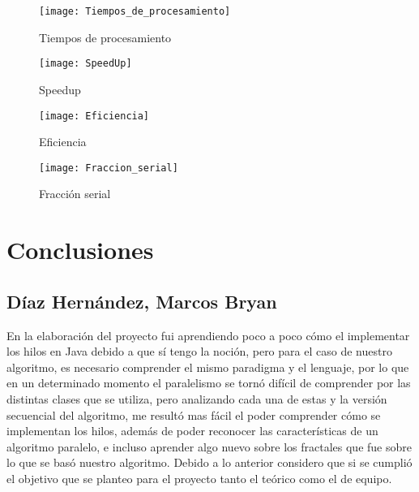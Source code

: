 \documentclass[12pt,a4paper]{article}
\begin{document}
		
			\begin{figure}[h]
				\centering
				\texttt{[image: Tiempos\_de\_procesamiento]}
				\caption{Tiempos de procesamiento}
			\end{figure}
	
			\begin{figure}[H]
				\centering
				\texttt{[image: SpeedUp]}
				\caption{Speedup}
			\end{figure}
		
			\begin{figure}[H]
				\centering
				\texttt{[image: Eficiencia]}
				\caption{Eficiencia}
			\end{figure}
		
			\begin{figure}[H]
				\centering
				\texttt{[image: Fraccion\_serial]}
				\caption{Fracción serial}
			\end{figure}
		
	
	\section{Conclusiones}
		\subsection{Díaz Hernández, Marcos Bryan}
			En la elaboración del proyecto fui aprendiendo poco a poco cómo el implementar los hilos en Java debido a que sí tengo la noción, pero para el caso de nuestro algoritmo, es necesario comprender el mismo paradigma y el lenguaje, por lo que en un determinado momento el paralelismo se tornó difícil de comprender por las distintas clases que se utiliza, pero analizando cada una de estas y la versión secuencial del algoritmo, me resultó mas fácil el poder comprender cómo se implementan los hilos, además de poder reconocer las características de un algoritmo paralelo, e incluso aprender algo nuevo sobre los fractales que fue sobre lo que se basó nuestro algoritmo. Debido a lo anterior considero que si se cumplió el objetivo que se planteo para el proyecto tanto el teórico como el de equipo. 
			
\end{document}
